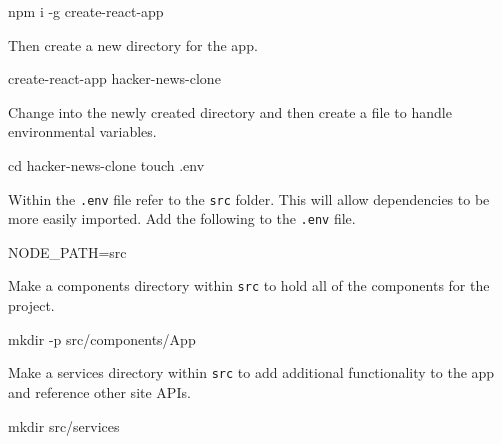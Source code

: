 \documentclass[]{book}
\newenvironment{Shaded}{\begin{snugshade}}{\end{snugshade}}
\newcommand{\BuiltInTok}[1]{#1}
\newcommand{\ExtensionTok}[1]{#1}
\newcommand{\FunctionTok}[1]{\textcolor[rgb]{0.00,0.00,0.00}{#1}}
\newcommand{\NormalTok}[1]{#1}
\newcommand{\VariableTok}[1]{\textcolor[rgb]{0.00,0.00,0.00}{#1}}
\begin{document}
\begin{Shaded}
\begin{Highlighting}[]
\ExtensionTok{npm}\NormalTok{ i -g create-react-app}
\end{Highlighting}
\end{Shaded}

Then create a new directory for the app.

\begin{Shaded}
\begin{Highlighting}[]
\ExtensionTok{create-react-app}\NormalTok{ hacker-news-clone}
\end{Highlighting}
\end{Shaded}

Change into the newly created directory and then create a file to handle environmental variables.

\begin{Shaded}
\begin{Highlighting}[]
\BuiltInTok{cd}\NormalTok{ hacker-news-clone}
\FunctionTok{touch}\NormalTok{ .env}
\end{Highlighting}
\end{Shaded}

Within the \texttt{.env} file refer to the \texttt{src} folder. This will allow dependencies to be more easily imported.
Add the following to the \texttt{.env} file.

\begin{Shaded}
\begin{Highlighting}[]
\VariableTok{NODE_PATH=}\NormalTok{src}
\end{Highlighting}
\end{Shaded}

Make a components directory within \texttt{src} to hold all of the components for the project.

\begin{Shaded}
\begin{Highlighting}[]
\FunctionTok{mkdir}\NormalTok{ -p src/components/App}
\end{Highlighting}
\end{Shaded}

Make a services directory within \texttt{src} to add additional functionality to the app and reference other site APIs.

\begin{Shaded}
\begin{Highlighting}[]
\FunctionTok{mkdir}\NormalTok{ src/services}
\end{Highlighting}
\end{Shaded}
\end{document}
